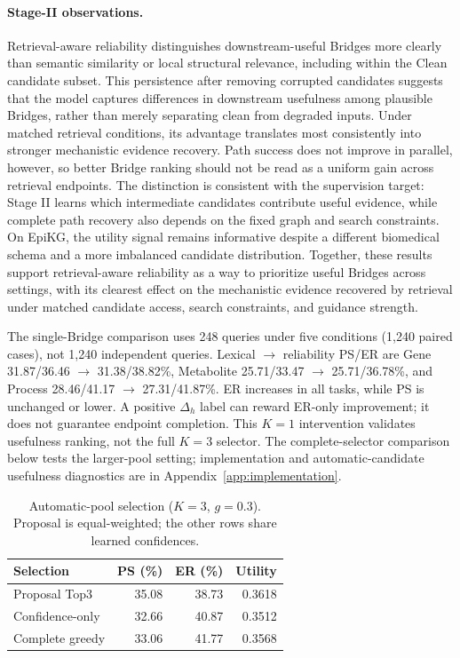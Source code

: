 \documentclass{article} %
\newcommand{\rev}[1]{{\color{blue}#1}}
\begin{document}
\paragraph{Stage-II observations.}
Retrieval-aware reliability distinguishes downstream-useful Bridges more clearly
than semantic similarity or local structural relevance, including within the Clean
candidate subset. This persistence after removing corrupted candidates suggests
that the model captures differences in downstream usefulness among plausible
Bridges, rather than merely separating clean from degraded inputs. Under matched
retrieval conditions, its advantage translates most consistently into stronger
mechanistic evidence recovery. Path success does not improve in parallel, however,
so better Bridge ranking should not be read as a uniform gain across retrieval
endpoints. The distinction is consistent with the supervision target: Stage II
learns which intermediate candidates contribute useful evidence, while complete
path recovery also depends on the fixed graph and search constraints. On EpiKG,
the utility signal remains informative despite a different biomedical schema and
a more imbalanced candidate distribution. Together, these results support
retrieval-aware reliability as a way to prioritize useful Bridges across settings,
with its clearest effect on the mechanistic evidence recovered by retrieval
under matched candidate access, search constraints, and guidance strength.

The single-Bridge comparison uses \rev{248 queries under five conditions (1,240 paired cases), not 1,240 independent queries.} \rev{Lexical $\rightarrow$ reliability PS/ER are Gene 31.87/36.46 $\rightarrow$ 31.38/38.82\%, Metabolite 25.71/33.47 $\rightarrow$ 25.71/36.78\%, and Process 28.46/41.17 $\rightarrow$ 27.31/41.87\%. ER increases in all tasks, while PS is unchanged or lower.} A positive $\Delta_h$ label can reward ER-only improvement; it does not guarantee endpoint completion. This $K=1$ intervention validates usefulness ranking, not the full $K=3$ selector. The complete-selector comparison below tests the larger-pool setting; implementation and automatic-candidate usefulness diagnostics are in Appendix~\ref{app:implementation}.

\begin{table}
\centering
\caption{Automatic-pool selection ($K=3$, $g=0.3$). Proposal is equal-weighted; the other rows share learned confidences.}
\label{tab:automatic_selector}
\small
\setlength{\tabcolsep}{3.5pt}
\begin{tabular}{@{}lrrr@{}}
\toprule
Selection & PS (\%) & ER (\%) & Utility \\
\midrule
Proposal Top3 & \rev{35.08} & \rev{38.73} & \rev{0.3618} \\
Confidence-only & \rev{32.66} & \rev{40.87} & \rev{0.3512} \\
Complete greedy & \rev{33.06} & \rev{41.77} & \rev{0.3568} \\
\bottomrule
\end{tabular}
\end{table}
\end{document}
